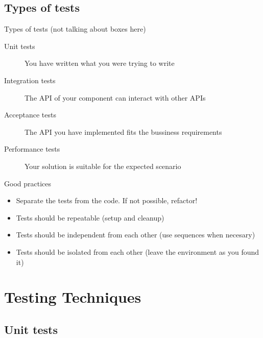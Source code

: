 \documentclass[pdf]{beamer}
\begin{document}
\subsection*{Types of tests}
\label{types_of_tests}

\begin{frame}{Types of tests (not talking about boxes here)}
    \begin{description}
    \item [Unit tests] You have written what you were trying to write
    \pause
    \item [Integration tests] The API of your component can interact with other APIs
    \pause
    \item [Acceptance tests] The API you have implemented fits the bussiness requirements
    \pause
    \item [Performance tests] Your solution is suitable for the expected scenario
    \end{description}
\end{frame}

\begin{frame}{Good practices}
    \begin{itemize}
    \item Separate the tests from the code. If not possible, refactor!
    \item Tests should be repeatable (setup and cleanup)
    \item Tests should be independent from each other (use sequences when necesary)
    \item Tests should be isolated from each other (leave the environment as you found it)
    \end{itemize}
\end{frame}



\section{Testing Techniques}

\subsection*{Unit tests}
\label{unit_testing}
\end{document}
